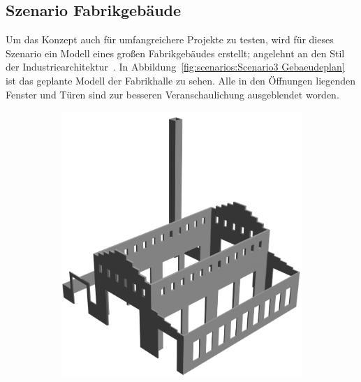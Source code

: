 \subsection{Szenario Fabrikgebäude}\label{scenarios:scenario3}
Um das Konzept auch für umfangreichere Projekte zu testen, wird für dieses Szenario ein Modell eines großen Fabrikgebäudes erstellt; angelehnt an den Stil der Industriearchitektur~\cite{Industriearchitektur}.
In Abbildung~\ref{fig:scenarios:Scenario3 Gebaeudeplan} ist das geplante Modell der Fabrikhalle zu sehen.
Alle in den Öffnungen liegenden Fenster und Türen sind zur besseren Veranschaulichung ausgeblendet worden.
\begin{figure}[hb!]
  \begin{subfigure}[b]{0.49\columnwidth}
    \includegraphics[width=\columnwidth]{fig/scenario3_render_ifc.png}
  \end{subfigure}
  \hfill
  \begin{subfigure}[b]{0.49\columnwidth}

\end{subfigure}
\end{figure}
